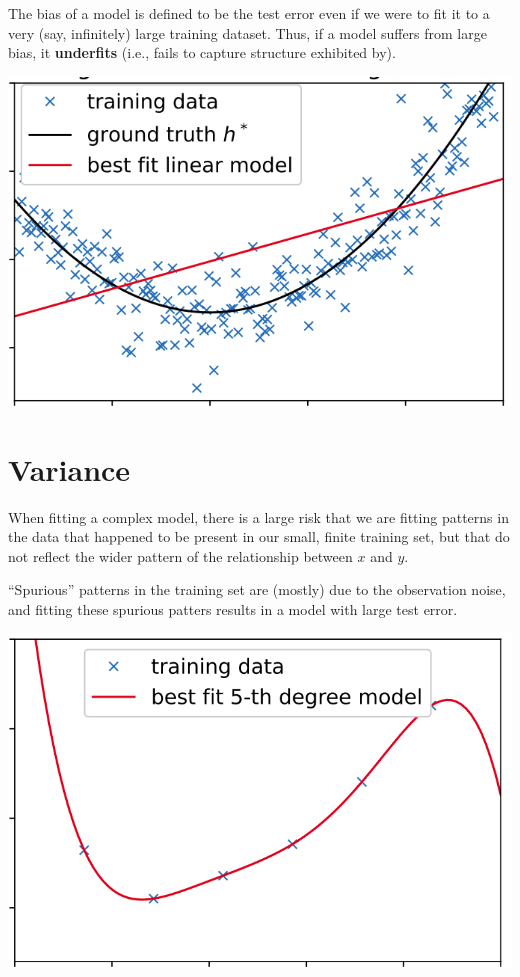 \documentclass[8pt, a4paper, landscape, includeheadfoot]{extarticle}
\begin{document}
\begin{multicols*}{4}
	The bias of a model is defined to be the test error even
	if we were to fit it to a very (say, infinitely) large training dataset. Thus, if a model suffers from large bias, it \textbf{underfits} (i.e., fails to
	capture structure exhibited by).
	\begin{center}
		\includegraphics[width = 0.8\linewidth]{0_images/high_bias.png}
	\end{center}

	\section{Variance}
	When fitting a complex model, there is a large risk that we are fitting patterns in the data that happened to be present in our small, finite training set, but that do not reflect the wider pattern of the relationship between $x$ and $y$.

	“Spurious” patterns in the training
	set are (mostly) due to the observation noise, and fitting these spurious patters results in a model with large test error.

	\begin{center}
		\includegraphics[width = 0.8\linewidth]{0_images/high_variance.png}
	\end{center}


\end{multicols*}
\end{document}
